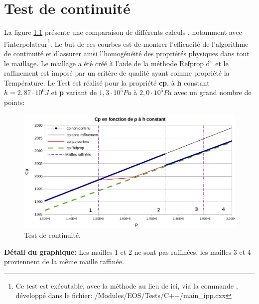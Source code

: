 \appendix
\chapter{Test de continuité}\label{cnt}
  
  La figure \ref{testcnt} présente une comparaison de différents calculs \EOS, notamment avec 
  l'interpolateur\footnote{Ce test est exécutable, avec la méthode  au lieu de  ici, via la commande ,
  développé dans le fichier: /Modules/EOS/Tests/C++/main\_ipp.cxx}.
  Le but de ces courbes est de montrer l'efficacité de l'algorithme de continuité et d'assurer ainsi l'homogénéité des propriétés physiques dans tout le maillage.
  Le maillage a été créé à l'aide de la méthode Refprop d'\EOS\ et le raffinement est imposé 
  par un critère de qualité ayant comme propriété la Température.
  Le Test est réalisé pour la propriété \textbf{cp}, à \textbf{h} constant $ h=2,87 \cdot 10^{6} J$ et 
  \textbf{p} variant de $ 1,3 \cdot 10^{5} Pa$ à $ 2,0 \cdot 10^{5} Pa$ avec un grand nombre de points:
  \begin{figure}[H]
    \center
    \includegraphics[width=1\textwidth]{Cp_continuite.eps}
    \caption{Test de continuité.}\label{testcnt}
  \end{figure}
  \textbf{Détail du graphique:}
  \smallbreak\vspace{0.3cm}
  Les mailles 1 et 2 ne sont pas raffinées, les mailles 3 et 4 proviennent de la même maille raffinée.
  \vspace{0.3cm}
